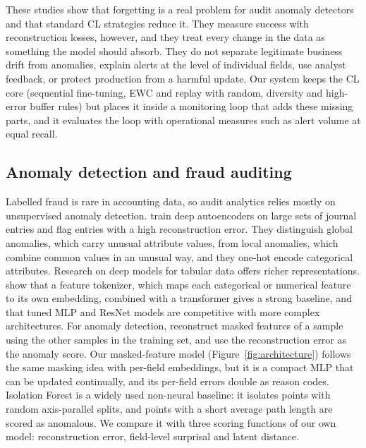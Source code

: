 \documentclass{article} %
\begin{document}
These studies show that forgetting is a real problem for audit anomaly
detectors and that standard CL strategies reduce it. They measure success with
reconstruction losses, however, and they treat every change in the data as
something the model should absorb. They do not separate legitimate business
drift from anomalies, explain alerts at the level of individual fields, use
analyst feedback, or protect production from a harmful update. Our system keeps
the CL core (sequential fine-tuning, EWC and replay with random, diversity and
high-error buffer rules) but places it inside a monitoring loop that adds these
missing parts, and it evaluates the loop with operational measures such as
alert volume at equal recall.

\subsection{Anomaly detection and fraud auditing}\label{sec:related-ad}
Labelled fraud is rare in accounting data, so audit analytics relies mostly on
unsupervised anomaly detection. \citet{schreyer2017detection} train deep
autoencoders on large sets of journal entries and flag entries with a high
reconstruction error. They distinguish global anomalies, which carry unusual
attribute values, from local anomalies, which combine common values in an
unusual way, and they one-hot encode categorical attributes. Research on deep
models for tabular data offers richer representations.
\citet{gorishniy2021revisiting} show that a feature tokenizer, which maps each
categorical or numerical feature to its own embedding, combined with a
transformer gives a strong baseline, and that tuned MLP and ResNet models are
competitive with more complex architectures. For anomaly detection,
\citet{thimonier2024beyond} reconstruct masked features of a sample using the
other samples in the training set, and use the reconstruction error as the
anomaly score. Our masked-feature model (Figure~\ref{fig:architecture}) follows
the same masking idea with per-field embeddings, but it is a compact MLP that
can be updated continually, and its per-field errors double as reason codes.
Isolation Forest \citep{liu2008isolation} is a widely used non-neural baseline:
it isolates points with random axis-parallel splits, and points with a short
average path length are scored as anomalous. We compare it with three scoring
functions of our own model: reconstruction error, field-level surprisal and
latent distance.
\end{document}
